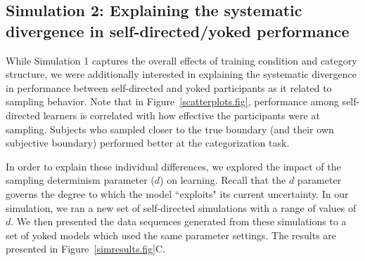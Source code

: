 \documentclass[3p,twocolumn,authoryear,10pt]{elsarticle}
\begin{document}

\subsection{Simulation 2: Explaining the systematic divergence in self-directed/yoked performance}

While Simulation 1 captures the overall effects of training condition and category structure, we were additionally interested in explaining the systematic divergence in performance between self-directed and yoked participants as it related to sampling behavior. Note that in Figure~\ref{scatterplots.fig}, performance among self-directed learners is correlated with how effective the participants were at sampling. Subjects who sampled closer to the true boundary (and their own subjective boundary) performed better at the categorization task.


In order to explain these individual differences, we explored the
impact of the sampling determinism parameter ($d$) on learning.
Recall that the $d$ parameter governs the degree to which the model ``exploits" its current uncertainty.
In our simulation, we ran a new set of self-directed simulations with a range
of values of $d$.  We then presented the data sequences generated from these simulations to a set of yoked models which used the
same parameter settings.  The results are presented in  Figure~\ref{simresults.fig}C. 
\end{document}
